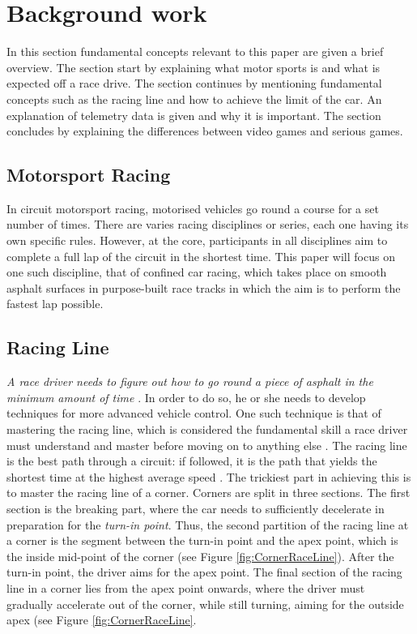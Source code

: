 \documentclass{sig-alternate}
\begin{document}
\section{Background work} {
\label{sec:background}

In this section fundamental concepts relevant to this paper are given a brief overview. The section start by explaining what motor sports is and what is expected off a race drive. The section continues by mentioning fundamental concepts such as the racing line and how to achieve the limit of the car. An explanation of telemetry data is given and why it is important. The section concludes by explaining the differences between video games and serious games. 

\subsection{Motorsport Racing}
In circuit motorsport racing, motorised vehicles go round a course for a set number of times. There are varies racing disciplines or series, each one having its own specific rules. However, at the core, participants in all disciplines aim to complete a full lap of the circuit in the shortest time. This paper will focus on one such discipline, that of confined car racing, which takes place on smooth asphalt surfaces in purpose-built race tracks in which the aim is to perform the fastest lap possible.

\subsection{Racing Line}
\emph{A race driver needs to figure out how to go round a piece of asphalt in the minimum amount of time} \cite{GoingFaster}. In order to do so, he or she needs to develop techniques for more advanced vehicle control. One such technique is that of mastering the racing line, which is considered the fundamental skill a race driver must understand and master before moving on to anything else \cite{GoingFaster}. The racing line is the best path through a circuit: if followed, it is the path that yields the shortest time at the highest average speed \cite{beckman1991physics}. The trickiest part in achieving this is to master the racing line of a corner. Corners are split in three sections. The first section is the breaking part, where the car needs to sufficiently decelerate in preparation for the  \emph{turn-in point}. Thus, the second partition of the racing line at a corner is the segment between the turn-in point and the apex point, which is the inside mid-point of the corner (see Figure \ref{fig:CornerRaceLine}). After the turn-in point, the driver aims for the apex point. The final section of the racing line in a corner lies from the apex point onwards, where the driver must gradually accelerate out of the corner, while still turning, aiming for the outside apex (see Figure \ref{fig:CornerRaceLine}.

}
\end{document}
